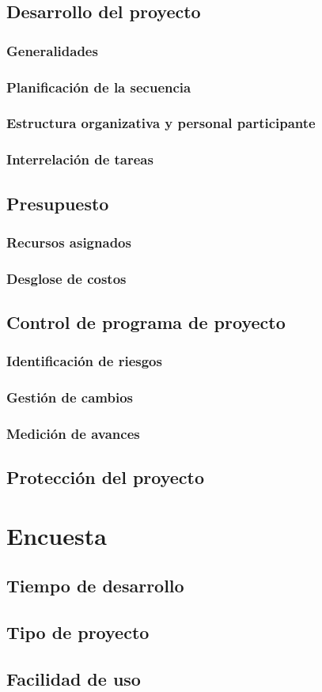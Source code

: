 \documentclass[]{article}
\begin{document}
\subsection{Desarrollo del proyecto}
\subsubsection{Generalidades}
\subsubsection{Planificaci\'on de la secuencia}
\subsubsection{Estructura organizativa y personal participante}
\subsubsection{Interrelaci\'on de tareas}
\subsection{Presupuesto}
\subsubsection{Recursos asignados}
\subsubsection{Desglose de costos}
\subsection{Control de programa de proyecto}
\subsubsection{Identificaci\'on de riesgos}
\subsubsection{Gesti\'on de cambios}
\subsubsection{Medici\'on de avances}
\subsection{Protecci\'on del proyecto}
\section{Encuesta}
\subsection{Tiempo de desarrollo}
\subsection{Tipo de proyecto}
\subsection{Facilidad de uso}
\end{document}
